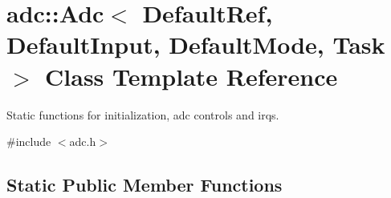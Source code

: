 \hypertarget{classadc_1_1Adc}{}\section{adc\+:\+:Adc$<$ Default\+Ref, Default\+Input, Default\+Mode, Task $>$ Class Template Reference}
\label{classadc_1_1Adc}


Static functions for initialization, adc controls and irqs.  




{\ttfamily \#include $<$adc.\+h$>$}

\subsection*{Static Public Member Functions}
